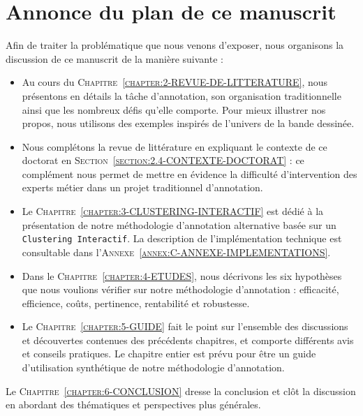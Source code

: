		
		
	\section*{Annonce du plan de ce manuscrit}
	\label{section:1.5-INTRODUCTION-ANNONCE-PLAN}
		
		Afin de traiter la problématique que nous venons d'exposer, nous organisons la discussion de ce manuscrit de la manière suivante :
		
		\begin{itemize}
			\item Au cours du \textsc{Chapitre~\ref{chapter:2-REVUE-DE-LITTERATURE}}, nous présentons en détails la tâche d'annotation, son organisation traditionnelle ainsi que les nombreux défis qu'elle comporte.
			Pour mieux illustrer nos propos, nous utilisons des exemples inspirés de l'univers de la bande dessinée.
			\item Nous complétons la revue de littérature en expliquant le contexte de ce doctorat en \textsc{Section~\ref{section:2.4-CONTEXTE-DOCTORAT}} : ce complément nous permet de mettre en évidence la difficulté d'intervention des experts métier dans un projet traditionnel d'annotation.
			\item Le \textsc{Chapitre~\ref{chapter:3-CLUSTERING-INTERACTIF}} est dédié à la présentation de notre méthodologie d'annotation alternative basée sur un \texttt{Clustering Interactif}.
			La description de l'implémentation technique est consultable dans l'\textsc{Annexe~\ref{annex:C-ANNEXE-IMPLEMENTATIONS}}.
			\item Dans le \textsc{Chapitre~\ref{chapter:4-ETUDES}}, nous décrivons les six hypothèses que nous voulions vérifier sur notre méthodologie d'annotation : efficacité, efficience, coûts, pertinence, rentabilité et robustesse.
			\item Le \textsc{Chapitre~\ref{chapter:5-GUIDE}} fait le point sur l'ensemble des discussions et découvertes contenues des précédents chapitres, et comporte différents avis et conseils pratiques.
			Le chapitre entier est prévu pour être un guide d'utilisation synthétique de notre méthodologie d'annotation.
		\end{itemize}
		
		Le \textsc{Chapitre~\ref{chapter:6-CONCLUSION}} dresse la conclusion et clôt la discussion en abordant des thématiques et perspectives plus générales.
